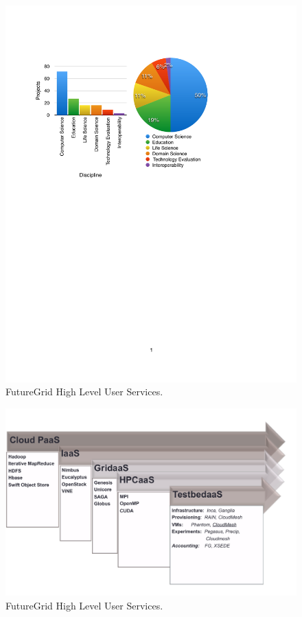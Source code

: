 \documentclass{article}
\begin{document}
\begin{figure}[htb]
  \caption{FutureGrid High Level User Services.}
  \centering
    \includegraphics[width=1.0\textwidth]{images/project-disciplines.pdf}
\end{figure}

\begin{figure}[h!]
  \caption{FutureGrid High Level User Services.}
  \centering
    \includegraphics[width=1.0\textwidth]{images/user-services.pdf}
\end{figure}
\end{document}
